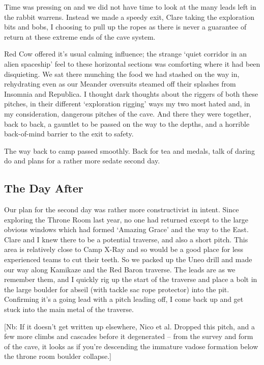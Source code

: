 Time was pressing on and we did not have time to look at the many leads
left in the rabbit warrens. Instead we made a speedy exit, Clare taking
the exploration bits and bobs, I choosing to pull up the ropes as there
is never a guarantee of return at these extreme ends of the cave system.

Red Cow offered it's usual calming influence; the strange `quiet
corridor in an alien spaceship' feel to these horizontal sections was
comforting where it had been disquieting. We sat there munching the food
we had stashed on the way in, rehydrating even as our Meander oversuits
steamed off their splashes from Insomnia and Republica. I thought dark
thoughts about the riggers of both these pitches, in their different
`exploration rigging' ways my two most hated and, in my consideration,
dangerous pitches of the cave. And there they were together, back to
back, a gauntlet to be passed on the way to the depths, and a horrible
back-of-mind barrier to the exit to safety.

The way back to camp passed smoothly. Back for tea and medals, talk of
daring do and plans for a rather more sedate second day.

\hypertarget{the-day-after}{%
\subsection{The Day After}\label{the-day-after}}

Our plan for the second day was rather more constructivist in intent.
Since exploring the Throne Room last year, no one had returned except to
the large obvious windows which had formed `Amazing Grace' and the way
to the East. Clare and I knew there to be a potential traverse, and also
a short pitch. This area is relatively close to Camp X-Ray and so would
be a good place for less experienced teams to cut their teeth. So we
packed up the Uneo drill and made our way along Kamikaze and the Red
Baron traverse. The leads are as we remember them, and I quickly rig up
the start of the traverse and place a bolt in the large boulder for
abseil (with tackle sac rope protector) into the pit. Confirming it's a
going lead with a pitch leading off, I come back up and get stuck into
the main metal of the traverse.

{[}Nb: If it doesn't get written up elsewhere, Nico et al. Dropped this
pitch, and a few more climbs and cascades before it degenerated -- from
the survey and form of the cave, it looks as if you're descending the
immature vadose formation below the throne room boulder collapse.{]}

